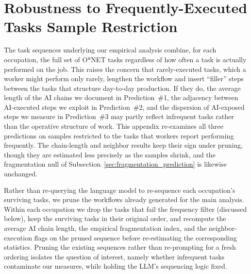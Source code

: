 \section{Robustness to Frequently-Executed Tasks Sample Restriction}
\label{app:frequency_robustness}

The task sequences underlying our empirical analysis combine, for each occupation, the full set of O*NET tasks regardless of how often a task is actually performed on the job.
This raises the concern that rarely-executed tasks, which a worker might perform only rarely, lengthen the workflow and insert ``filler'' steps between the tasks that structure day-to-day production.
If they do, the average length of the AI chains we document in Prediction~\#1, the adjacency between AI-executed steps we exploit in Prediction~\#2, and the dispersion of AI-exposed steps we measure in Prediction~\#3 may partly reflect infrequent tasks rather than the operative structure of work.
This appendix re-examines all three predictions on samples restricted to the tasks that workers report performing frequently.
The chain-length and neighbor results keep their sign under pruning, though they are estimated less precisely as the samples shrink, and the fragmentation null of Subsection~\ref{sec:fragmentation_prediction} is likewise unchanged.

Rather than re-querying the language model to re-sequence each occupation's surviving tasks, we prune the workflows already generated for the main analysis.
Within each occupation we drop the tasks that fail the frequency filter (discussed below), keep the surviving tasks in their original order, and recompute the average AI chain length, the empirical fragmentation index, and the neighbor-execution flags on the pruned sequence before re-estimating the corresponding statistics. 
Pruning the existing sequences rather than re-prompting for a fresh ordering isolates the question of interest, namely whether infrequent tasks contaminate our measures, while holding the LLM's sequencing logic fixed.

